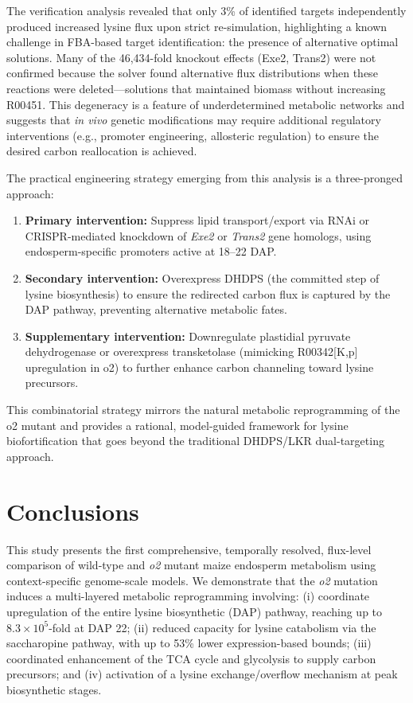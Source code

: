 The verification analysis revealed that only 3\% of identified targets independently produced increased lysine flux upon strict re-simulation, highlighting a known challenge in FBA-based target identification: the presence of alternative optimal solutions. Many of the 46,434-fold knockout effects (Exe2, Trans2) were not confirmed because the solver found alternative flux distributions when these reactions were deleted---solutions that maintained biomass without increasing R00451. This degeneracy is a feature of underdetermined metabolic networks and suggests that \textit{in vivo} genetic modifications may require additional regulatory interventions (e.g., promoter engineering, allosteric regulation) to ensure the desired carbon reallocation is achieved.

The practical engineering strategy emerging from this analysis is a three-pronged approach:
\begin{enumerate}
    \item \textbf{Primary intervention:} Suppress lipid transport/export via RNAi or CRISPR-mediated knockdown of \textit{Exe2} or \textit{Trans2} gene homologs, using endosperm-specific promoters active at 18--22 DAP.
    \item \textbf{Secondary intervention:} Overexpress DHDPS (the committed step of lysine biosynthesis) to ensure the redirected carbon flux is captured by the DAP pathway, preventing alternative metabolic fates.
    \item \textbf{Supplementary intervention:} Downregulate plastidial pyruvate dehydrogenase or overexpress transketolase (mimicking R00342[K,p] upregulation in o2) to further enhance carbon channeling toward lysine precursors.
\end{enumerate}

This combinatorial strategy mirrors the natural metabolic reprogramming of the o2 mutant and provides a rational, model-guided framework for lysine biofortification that goes beyond the traditional DHDPS/LKR dual-targeting approach.


\section{Conclusions}

This study presents the first comprehensive, temporally resolved, flux-level comparison of wild-type and \textit{o2} mutant maize endosperm metabolism using context-specific genome-scale models. We demonstrate that the \textit{o2} mutation induces a multi-layered metabolic reprogramming involving: (i) coordinate upregulation of the entire lysine biosynthetic (DAP) pathway, reaching up to $8.3 \times 10^{5}$-fold at DAP 22; (ii) reduced capacity for lysine catabolism via the saccharopine pathway, with up to 53\% lower expression-based bounds; (iii) coordinated enhancement of the TCA cycle and glycolysis to supply carbon precursors; and (iv) activation of a lysine exchange/overflow mechanism at peak biosynthetic stages.

